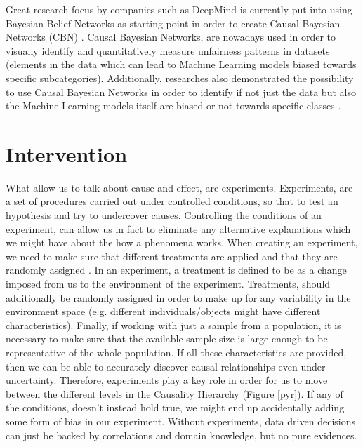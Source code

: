 Great research focus by companies such as DeepMind is currently put into using Bayesian Belief Networks as starting point in order to create Causal Bayesian Networks (CBN) \cite{deep}. Causal Bayesian Networks, are nowadays used in order to visually identify and quantitatively measure unfairness patterns in datasets (elements in the data which can lead to Machine Learning models biased towards specific subcategories). Additionally, researches also demonstrated the possibility to use Causal Bayesian Networks in order to identify if not just the data but also the Machine Learning models itself are biased or not towards specific classes \cite{deep2}.

\section{Intervention}
What allow us to talk about cause and effect, are experiments. Experiments, are a set of procedures carried out under controlled conditions, so that to test an hypothesis and try to undercover causes. Controlling the conditions of an experiment, can allow us in fact to eliminate any alternative explanations which we might have about the how a phenomena works. When creating an experiment, we need to make sure that different treatments are applied and that they are randomly assigned \cite{cassie}. In an experiment, a treatment is defined to be as a change imposed from us to the environment of the experiment. Treatments, should additionally be randomly assigned in order to make up for any variability in the environment space (e.g. different individuals/objects might have different characteristics). Finally, if working with just a sample from a population, it is necessary to make sure that the available sample size is large enough to be representative of the whole population. If all these characteristics are provided, then we can be able to accurately discover causal relationships even under uncertainty. Therefore, experiments play a key role in order for us to move between the different levels in the Causality Hierarchy (Figure \ref{pyr}). If any of the conditions, doesn't instead hold true, we might end up accidentally adding some form of bias in our experiment. Without experiments, data driven decisions can just be backed by correlations and domain knowledge, but no pure evidences.

